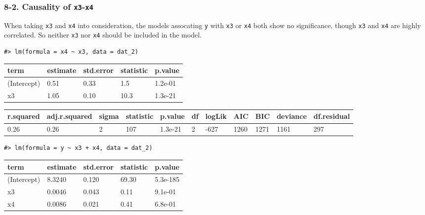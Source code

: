 \documentclass[a4paper]{article}
\begin{document}
\hypertarget{causality-of-x3-x4}{%
\subsubsection{\texorpdfstring{8-2. Causality of
\texttt{x3}-\texttt{x4}}{8-2. Causality of x3-x4}}\label{causality-of-x3-x4}}

When taking \texttt{x3} and \texttt{x4} into consideration, the models
assocating \texttt{y} with \texttt{x3} or \texttt{x4} both show no
significance, though \texttt{x3} and \texttt{x4} are highly correlated.
So neither \texttt{x3} nor \texttt{x4} should be included in the model.

\begin{verbatim}
#> lm(formula = x4 ~ x3, data = dat_2)
\end{verbatim}

\begin{table}[H]
\centering
\begin{tabular}{lllll}
\toprule
term & estimate & std.error & statistic & p.value\\
\midrule
(Intercept) & 0.51 & 0.33 & 1.5 & 1.2e-01\\
x3 & 1.05 & 0.10 & 10.3 & 1.3e-21\\
\bottomrule
\end{tabular}
\end{table}

\begin{table}[H]
\centering
\begin{tabular}{lllllllllll}
\toprule
r.squared & adj.r.squared & sigma & statistic & p.value & df & logLik & AIC & BIC & deviance & df.residual\\
\midrule
0.26 & 0.26 & 2 & 107 & 1.3e-21 & 2 & -627 & 1260 & 1271 & 1161 & 297\\
\bottomrule
\end{tabular}
\end{table}

\begin{verbatim}
#> lm(formula = y ~ x3 + x4, data = dat_2)
\end{verbatim}

\begin{table}[H]
\centering
\begin{tabular}{lllll}
\toprule
term & estimate & std.error & statistic & p.value\\
\midrule
(Intercept) & 8.3240 & 0.120 & 69.30 & 5.3e-185\\
x3 & 0.0046 & 0.043 & 0.11 & 9.1e-01\\
x4 & 0.0086 & 0.021 & 0.41 & 6.8e-01\\
\bottomrule
\end{tabular}
\end{table}
\end{document}
